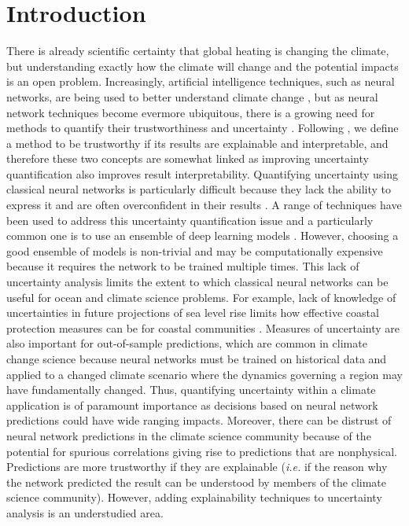 \documentclass[a4paper]{article}
\begin{document}
\section{Introduction}\label{sec:intro}
There is already scientific certainty that global heating is changing the climate, but understanding exactly how the climate will change and the potential impacts is an open problem. Increasingly, artificial intelligence techniques, such as neural networks, are being used to better understand climate change \citep[for example][]{ham2019deep,huntingford2019machine,rolnick2019tackling,cowls2021ai}, but as neural network techniques become evermore ubiquitous, there is a growing need for methods to quantify their trustworthiness and uncertainty \citep{li2021trustworthy,mamalakis2021neural}. Following \cite{THOR}, we define a method to be trustworthy if its results are explainable and interpretable, and therefore these two concepts are somewhat linked as improving uncertainty quantification also improves result interpretability. Quantifying uncertainty using classical neural networks is particularly difficult because they lack the ability to express it and are often overconfident in their results \citep{mitros2019validity,Joo2020}. A range of techniques have been used to address this uncertainty quantification issue \citep{guo2017calibration} and a particularly common one is to use an ensemble of deep learning models \citep[for example][]{beluch2018power}. However, choosing a good ensemble of models is non-trivial \citep[see][]{Scher2020} and may be computationally expensive because it requires the network to be trained multiple times. This lack of uncertainty analysis limits the extent to which classical neural networks can be useful for ocean and climate science problems. For example, lack of knowledge of uncertainties in future projections of sea level rise limits how effective coastal protection measures can be for coastal communities \citep{sanchez2021coastal}. Measures of uncertainty are also important for out-of-sample predictions, which are common in climate change science because neural networks must be trained on historical data and applied to a changed climate scenario where the dynamics governing a region may have fundamentally changed. Thus, quantifying uncertainty within a climate application is of paramount importance as decisions based on neural network predictions could have wide ranging impacts. Moreover, there can be distrust of neural network predictions in the climate science community because of the potential for spurious correlations giving rise to predictions that are nonphysical. Predictions are more trustworthy if they are explainable (\textit{i.e.} if the reason why the network predicted the result can be understood by members of the climate science community). However, adding explainability techniques to uncertainty analysis is an understudied area.
\end{document}
